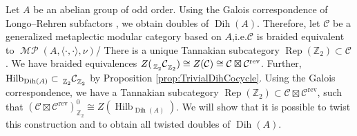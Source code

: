 \documentclass[twoside,11pt,reqno]{amsart}
\makeatletter
\theoremstyle{definition}
\theoremstyle{remark}
\newcommand{\cC}{\mathcal{C}}
\newcommand{\ZZ}{\mathbb{Z}}
\DeclareMathOperator{\Rep}{Rep}
\DeclareRobustCommand{\ie}{i.e.\@\xspace}
\DeclareMathOperator{\Dih}{Dih}
\DeclareMathOperator*{\MP}{\mathcal{MP}}
\DeclareMathOperator{\Vect}{Hilb}
\newcommand{\bi}[2]{\langle #1,#2\rangle}
\newcommand{\bim}[4][]{{}\prescript{\vphantom{#1}}{#2}{#3}^{#1}_{#4}}
\newcommand{\rev}[1]{{#1}^\mathrm{rev}}
\newcommand{\bislotslot}{\bi\cdot\cdot}
\makeatother
\begin{document}
Let $A$ be an abelian group of odd order. 
Using the Galois correspondence of Longo--Rehren subfactors \cite{Iz2000}, 
we obtain doubles of $\Dih(A)$.  
Therefore, let $\cC$ be a generalized metaplectic modular category based on $A$,\ie $\cC$ is braided equivalent to $\MP(A,\bislotslot,\nu)$/
There is a unique Tannakian subcategory $\Rep(\ZZ_2)\subset \cC$. 
We have braided equivalences 
$Z(\bim{\ZZ_2}\cC{\ZZ_2})\cong Z(\cC)\cong \cC\boxtimes\rev{\cC}$.
Further, $\Vect_{\Dih(A)}\subset \bim{\ZZ_2}\cC{\ZZ_2}$ by 
  Proposition \ref{prop:TrivialDihCocycle}.
Using the Galois correspondence, we have a Tannakian subcategory 
$\Rep(\ZZ_2)\subset \cC\boxtimes\rev{\cC}$, such that
$(\cC\boxtimes \rev{\cC})_{\ZZ_2}^0\cong Z(\Vect_{\Dih(A)})$.
We will show that it is possible to twist this construction and to obtain all 
twisted doubles of $\Dih(A)$. 
\end{document}
